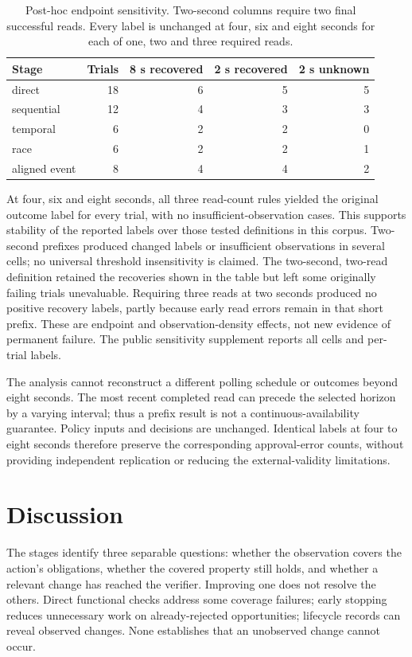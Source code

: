 \documentclass[manuscript,review,nonacm]{acmart}
\begin{document}
\begin{table}[t]
\caption{Post-hoc endpoint sensitivity. Two-second columns require two final successful reads. Every label is unchanged at four, six and eight seconds for each of one, two and three required reads.}
\label{tab:stage-5-5}
\centering
\begin{tabularx}{\linewidth}{@{}Xrrrr@{}}
\toprule
Stage & Trials & 8 s recovered & 2 s recovered & 2 s unknown \\
\midrule
direct & 18 & 6 & 5 & 5 \\
sequential & 12 & 4 & 3 & 3 \\
temporal & 6 & 2 & 2 & 0 \\
race & 6 & 2 & 2 & 1 \\
aligned event & 8 & 4 & 4 & 2 \\
\bottomrule
\end{tabularx}
\end{table}

At four, six and eight seconds, all three read-count rules yielded the original outcome label for every trial, with no insufficient-observation cases. This supports stability of the reported labels over those tested definitions in this corpus. Two-second prefixes produced changed labels or insufficient observations in several cells; no universal threshold insensitivity is claimed. The two-second, two-read definition retained the recoveries shown in the table but left some originally failing trials unevaluable. Requiring three reads at two seconds produced no positive recovery labels, partly because early read errors remain in that short prefix. These are endpoint and observation-density effects, not new evidence of permanent failure. The public sensitivity supplement reports all cells and per-trial labels.

The analysis cannot reconstruct a different polling schedule or outcomes beyond eight seconds. The most recent completed read can precede the selected horizon by a varying interval; thus a prefix result is not a continuous-availability guarantee. Policy inputs and decisions are unchanged. Identical labels at four to eight seconds therefore preserve the corresponding approval-error counts, without providing independent replication or reducing the external-validity limitations.

\section{Discussion}
The stages identify three separable questions: whether the observation covers the action's obligations, whether the covered property still holds, and whether a relevant change has reached the verifier. Improving one does not resolve the others. Direct functional checks address some coverage failures; early stopping reduces unnecessary work on already-rejected opportunities; lifecycle records can reveal observed changes. None establishes that an unobserved change cannot occur.
\end{document}
